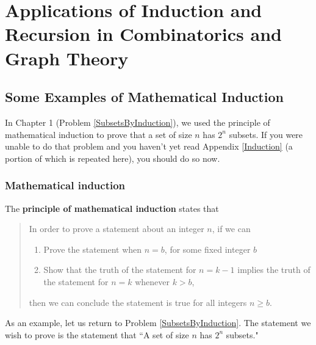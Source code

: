 \chapter{Applications of Induction and Recursion in Combinatorics and
Graph Theory}
\section{Some Examples of Mathematical Induction}
 In Chapter 1 (Problem
\ref{SubsetsByInduction}), we used the principle of mathematical
induction to prove that a set of size $n$ has
$2^n$ subsets.  If you were unable to do that problem and you haven't yet
read Appendix \ref{Induction} (a portion of which is repeated here), you
should do so now.
\subsection{Mathematical induction}  The {\bf principle of mathematical
induction}
states that
\begin{quote}
In order to prove a statement about an integer $n$, if we
can\begin{enumerate}
\item Prove the statement when $n=b$, for some fixed integer $b$
\item Show that the truth of the statement for $n=k-1$ implies the truth
of the statement for $n=k$ whenever $k>b$,
\end{enumerate}
then we can conclude the statement is true for all integers $n\ge
b$.\end{quote} As an example, let us return to Problem
\ref{SubsetsByInduction}.  The statement we wish to prove is the
statement that ``A set of size $n$ has $2^n$ subsets."  

